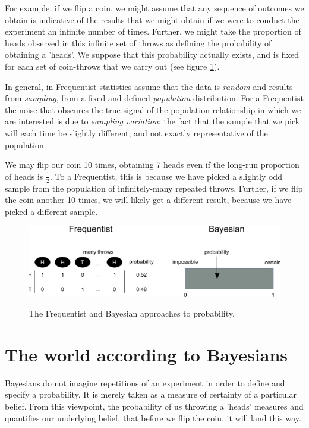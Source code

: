 \documentclass[11pt,fullpage]{book}
\begin{document}
For example, if we flip a coin, we might assume that any sequence of outcomes we obtain is indicative of the results that we might obtain if we were to conduct the experiment an infinite number of times. Further, we might take the proportion of heads observed in this infinite set of throws as defining the probability of obtaining a 'heads'. We suppose that this probability actually exists, and is fixed for each set of coin-throws that we carry out (see figure \ref{fig:Intro_FrequentistBayesProbability}).

In general, in Frequentist statistics assume that the data is \textit{random} and results from \textit{sampling}, from a fixed and defined \textit{population} distribution. For a Frequentist the noise that obscures the true signal of the population relationship in which we are interested is due to \textit{sampling variation}; the fact that the sample that we pick will each time be slightly different, and not exactly representative of the population. 

We may flip our coin 10 times, obtaining 7 heads even if the long-run proportion of heads is $\frac{1}{2}$. To a Frequentist, this is because we have picked a slightly odd sample from the population of infinitely-many repeated throws. Further, if we flip the coin another 10 times, we will likely get a different result, because we have picked a different sample.

\begin{figure}
\centering
\scalebox{0.3} 
{\includegraphics{Intro_FrequentistBayesProbability.pdf}}
\caption{The Frequentist and Bayesian approaches to probability.}\label{fig:Intro_FrequentistBayesProbability}
\end{figure}

\section{The world according to Bayesians}
Bayesians do not imagine repetitions of an experiment in order to define and specify a probability. It is merely taken as a measure of certainty of a particular belief. From this viewpoint, the probability of us throwing a 'heads' measures and quantifies our underlying belief, that before we flip the coin, it will land this way. 
\end{document}
